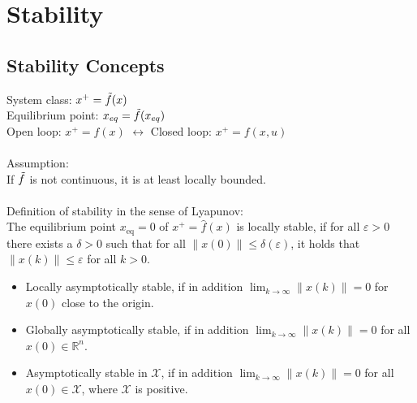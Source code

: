 \documentclass[english]{latex4ei/latex4ei_sheet}
\begin{document}
\section{Stability}
\begin{sectionbox}

\subsection{Stability Concepts}
System class: $x^{+}=\Tilde{f}(x)$\\
Equilibrium point: $x_{eq}=\Tilde{f}(x_{eq})$\\
Open loop: $x^{+}=f(x)$ \; $\longleftrightarrow$ \; Closed loop: $x^{+}=f(x,u)$\\
\\
Assumption:\\
If $\Tilde{f}$ is not continuous, it is at least locally bounded.\\
\\
Definition of stability in the sense of Lyapunov:\\
The equilibrium point $x_{\mathrm{eq}}=0$ of $x^{+}=\hat{f}(x)$ is locally stable, if for all $\varepsilon>0$ there exists a $\delta>0$ such that for all $\|x(0)\| \leq \delta(\varepsilon)$, it holds that $\|x(k)\| \leq \varepsilon$ for all $k>0$.
\begin{itemize}
    \item Locally asymptotically stable, if in addition $\lim _{k \rightarrow \infty}\|x(k)\|=0$ for $x(0)$ close to the origin.
    \item Globally asymptotically stable, if in addition $\lim _{k \rightarrow \infty}\|x(k)\|=0$ for all $x(0) \in \mathbb{R}^{n}$.
    \item Asymptotically stable in $\mathcal{X}$, if in addition $\lim _{k \rightarrow \infty}\|x(k)\|=0$ for all $x(0) \in \mathcal{X}$, where $\mathcal{X}$ is positive.
\end{itemize}

\end{sectionbox}
\end{document}
